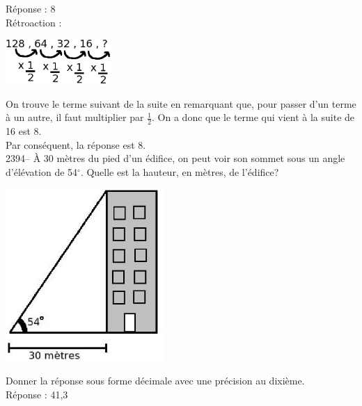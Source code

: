 \documentclass[letterpaper, 12pt]{article}
\begin{document}
R\'eponse : 8\\

R\'etroaction :\\
\begin{center}
 \includegraphics[width=4cm,bb=14 14 358 185]{Q2393.eps}
\end{center}
On trouve le terme suivant de la suite en remarquant que, pour passer d'un terme \`a un autre, il faut multiplier par $\frac{1}{2}$. On a donc que le terme qui vient \`a la suite de 16 est 8.\\
Par cons\'equent, la r\'eponse est 8.\\

2394-- \`A 30 m\`etres du pied d'un \'edifice, on peut voir son sommet sous un angle d'\'el\'evation de 54$^{\circ}$. Quelle est la hauteur, en m\`etres, de l'\'edifice?\\
\begin{center}
 \includegraphics[width=6cm,bb=14 14 320 339]{Q2394.eps}
\end{center}
Donner la r\'eponse sous forme d\'ecimale avec une pr\'ecision au dixi\`eme.\\

R\'eponse : 41,3\\
\end{document}
